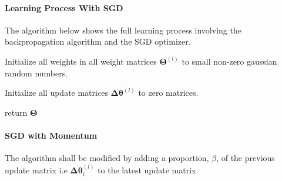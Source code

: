 \documentclass{article}
\begin{document}
\paragraph{Learning Process With SGD}
The algorithm below shows the full learning process involving the backpropagation algorithm and the SGD optimizer.
\begin{algorithm}
	\SetAlgoLined
	
	Initialize all weights in all weight matrices $\boldsymbol\Theta^{(l)}$ to small non-zero gaussian random numbers.
	
	Initialize all update matrices $\boldsymbol{\Delta\theta}^{(l)}$ to zero matrices.
	
return $\boldsymbol\Theta$
\end{algorithm}

\paragraph{SGD with Momentum}

The algorithm shall be modified by adding a proportion, $\beta$, of the previous update matrix i.e $\boldsymbol{\Delta\theta}^{(l)}_i$ to the latest update matrix.
\end{document}
